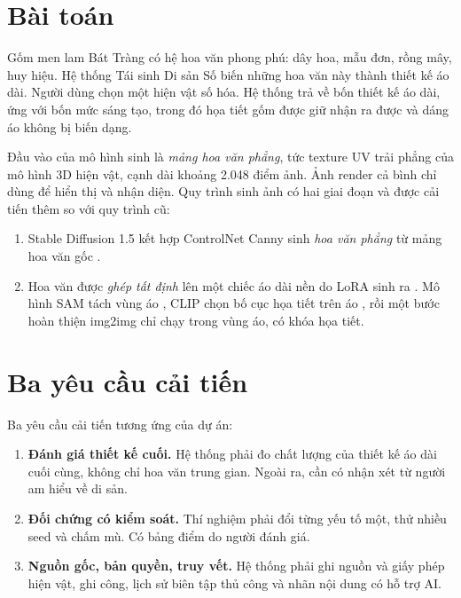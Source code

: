 \documentclass[12pt,a4paper]{report}
\begin{document}
\section{Bài toán}

Gốm men lam Bát Tràng có hệ hoa văn phong phú: dây hoa, mẫu đơn, rồng mây, huy hiệu. Hệ thống Tái sinh Di sản Số biến những hoa văn này thành thiết kế áo dài. Người dùng chọn một hiện vật số hóa. Hệ thống trả về bốn thiết kế áo dài, ứng với bốn mức sáng tạo, trong đó họa tiết gốm được giữ nhận ra được và dáng áo không bị biến dạng.

Đầu vào của mô hình sinh là \emph{mảng hoa văn phẳng}, tức texture UV trải phẳng của mô hình 3D hiện vật, cạnh dài khoảng 2.048 điểm ảnh. Ảnh render cả bình chỉ dùng để hiển thị và nhận diện. Quy trình sinh ảnh có hai giai đoạn và được cải tiến thêm so với quy trình cũ:
\begin{enumerate}
  \item Stable Diffusion 1.5 kết hợp ControlNet Canny sinh \emph{hoa văn phẳng} từ mảng hoa văn gốc \parencite{rombach2022,zhang2023controlnet}.
  \item Hoa văn được \emph{ghép tất định} lên một chiếc áo dài nền do LoRA sinh ra \parencite{hu2022lora}. Mô hình SAM tách vùng áo \parencite{kirillov2023sam}, CLIP chọn bố cục họa tiết trên áo \parencite{radford2021clip}, rồi một bước hoàn thiện img2img chỉ chạy trong vùng áo, có khóa họa tiết.
\end{enumerate}



\section{Ba yêu cầu cải tiến}

Ba yêu cầu cải tiến tương ứng của dự án:
\begin{enumerate}
  \item \textbf{Đánh giá thiết kế cuối.} Hệ thống phải đo chất lượng của thiết kế áo dài cuối cùng, không chỉ hoa văn trung gian. Ngoài ra, cần có nhận xét từ người am hiểu về di sản.
  \item \textbf{Đối chứng có kiểm soát.} Thí nghiệm phải đổi từng yếu tố một, thử nhiều seed và chấm mù. Có bảng điểm do người đánh giá.
  \item \textbf{Nguồn gốc, bản quyền, truy vết.} Hệ thống phải ghi nguồn và giấy phép hiện vật, ghi công, lịch sử biên tập thủ công và nhãn nội dung có hỗ trợ AI.
\end{enumerate}
\end{document}
